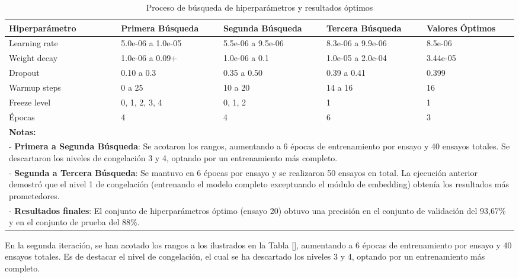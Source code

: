 \begin{table}[htbp]
    \centering
    \caption{Proceso de búsqueda de hiperparámetros y resultados óptimos}
    \label{tabla:hiperparametros}
    \begin{tabular}{|l|p{2.6cm}|p{2.6cm}|p{2.6cm}|p{2cm}|}
        \hline
        \textbf{Hiperparámetro} & \textbf{Primera Búsqueda} & \textbf{Segunda Búsqueda} & \textbf{Tercera Búsqueda} & \textbf{Valores Óptimos} \\
        \hline
        Learning rate & 5.0e-06 a 1.0e-05 & 5.5e-06 a 9.5e-06 & 8.3e-06 a 9.9e-06 & 8.5e-06 \\
        \hline
        Weight decay & 1.0e-06 a 0.09+ & 1.0e-06 a 0.1 & 1.0e-05 a 2.0e-04 & 3.44e-05 \\
        \hline
        Dropout & 0.10 a 0.3 & 0.35 a 0.50 & 0.39 a 0.41 & 0.399 \\
        \hline
        Warmup steps & 0 a 25 & 10 a 20 & 14 a 16 & 16 \\
        \hline
        Freeze level & 0, 1, 2, 3, 4 & 0, 1, 2 & 1 & 1 \\
        \hline
        Épocas & 4 & 4 & 6 & 3 \\
        \hline
        \multicolumn{5}{|p{13cm}|}{\textbf{Notas:}} \\
        \hline
        \multicolumn{5}{|p{13cm}|}{- \textbf{Primera a Segunda Búsqueda}: Se acotaron los rangos, aumentando a 6 épocas de entrenamiento por ensayo y 40 ensayos totales. Se descartaron los niveles de congelación 3 y 4, optando por un entrenamiento más completo.} \\
        \hline
        \multicolumn{5}{|p{13cm}|}{- \textbf{Segunda a Tercera Búsqueda}: Se mantuvo en 6 épocas por ensayo y se realizaron 50 ensayos en total. La ejecución anterior demostró que el nivel 1 de congelación (entrenando el modelo completo exceptuando el módulo de embedding) obtenía los resultados más prometedores.} \\
        \hline
        \multicolumn{5}{|p{13cm}|}{- \textbf{Resultados finales}: El conjunto de hiperparámetros óptimo (ensayo 20) obtuvo una precisión en el conjunto de validación del 93,67\% y en el conjunto de prueba del 88\%.} \\
        \hline
    \end{tabular}
\end{table}


En la segunda iteración, se han acotado los rangos a los ilustrados en la Tabla \ref{}, aumentando a 6 épocas de entrenamiento por ensayo y 40 ensayos totales. Es de destacar el nivel de congelación, el cual se ha descartado los niveles 3 y 4, optando por un entrenamiento más completo. 


